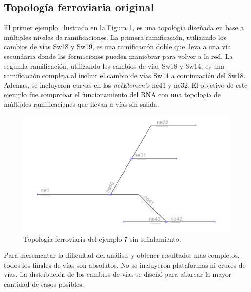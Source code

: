 \subsection{Topología ferroviaria original}

	El primer ejemplo, ilustrado en la Figura \ref{fig:EJ7_1}, es una topología diseñada en base a múltiples niveles de ramificaciones. La primera ramificación, utilizando los cambios de vías Sw18 y Sw19, es una ramificación doble que lleva a una vía secundaria donde las formaciones pueden maniobrar para volver a la red. La segunda ramificación, utilizando los cambios de vías Sw18 y Sw14, es una ramificación compleja al incluir el cambio de vías Sw14 a continuación del Sw18. Ademas, se incluyeron curvas en los \textit{netElements} ne41 y ne32. El objetivo de este ejemplo fue comprobar el funcionamiento del RNA con una topología de múltiples ramificaciones que llevan a vías sin salida.	
	
	\begin{figure}[h]
		\centering
		\includegraphics[width=1\textwidth]{resultados-obtenidos/ejemplo7/images/7_empty.png}
		\centering\caption{Topología ferroviaria del ejemplo 7 sin señalamiento.}
		\label{fig:EJ7_1}
	\end{figure}
	
	Para incrementar la dificultad del análisis y obtener resultados mas completos, todos los finales de vías son absolutos. No se incluyeron plataformas ni cruces de vías. La distribución de los cambios de vías se diseñó para abarcar la mayor cantidad de casos posibles.